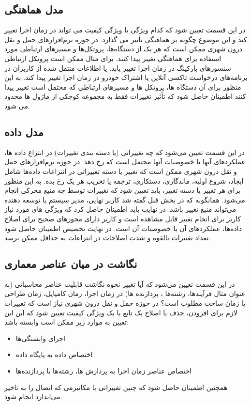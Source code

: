 \subsection{مدل هماهنگی}
در این قسمت تعیین شود که کدام ویژگی یا ویژگی کیفیت می تواند در زمان اجرا تغییر کند و این موضوع چگونه بر هماهنگی تأثیر می گذارد. 
در حوزه نرم‌افزارهای حمل و نقل درون شهری ممکن است که هر یک از دستگاه‌ها، پروتکل‌ها و مسیرهای ارتباطی مورد استفاده برای هماهنگی تغییر پیدا کنند. برای مثال ممکن است پروتکل ارتباطی سنسورهای پارکینگ در زمان اجرا تغییر یابد. یا اطلاعات منتقل شده از کاربران در برنامه‌‌های درخواست تاکسی آنلاین یا اشتراک خودرو در زمان اجرا تغییر پیدا کند. به این منظور برای آن دستگاه ها، پروتکل ها و مسیرهای ارتباطی که محتمل است تغییر پیدا کنند اطمینان حاصل شود که تأثیر تغییرات فقط به مجموعه کوچکی از ماژول ها محدود می شود.
\subsection{مدل داده}
در این قسمت تعیین می‌شود که چه تغییراتی (یا دسته بندی تغییرات) در انتزاع داده ها، عملکردهای آنها یا خصوصیات آنها محتمل است که رخ دهد. در حوزه نرم‌افزارهای حمل و نقل درون شهری ممکن است که تغییر یا دسته تغییراتی در انتزاعات داده‌ها شامل ایجاد، شروع اولیه، ماندگاری، دستکاری، ترجمه یا تخریب هر یک رخ بده. به این منظور برای هر تغییر یا دسته تغییر، باید تعیین شود که تغییرات توسط چه منبع محرکی انجام می‌شود. همانگونه که در بخش قبل گفته شد کاربر نهایی، مدیر سیستم یا توسعه دهنده می‌تواند منبع تغییر باشد. در نهایت باید اطمینان حاصل کرد که ویژگی های مورد نیاز کاربر برای انجام تغییر قابل مشاهده است و  کاربر دارای مجوزهای صحیح برای اصلاح داده‌ها، عملکردهای آن یا خصوصیات آن است. در نهایت تخصیص اطمینان حاصل شود تعداد تغییرات بالقوه و شدت اصلاحات در انتزاعات به حداقل ممکن برسد.

\subsection{نگاشت در میان عناصر معماری}
در این قسمت تعیین می‌شود که آیا تغییر نحوه نگاشت قابلیت عناصر محاسباتی (به عنوان مثال فرآیندها، رشته‌ها ، پردازنده ها) در زمان اجرا، زمان کامپایل، زمان طراحی یا زمان ساخت مطلوب است؟
در حوزه حمل و نقل درون شهری نیاز است که تغییرات لازم برای افزودن، حذف یا اصلاح یک تابع یا یک ویژگی کیفیت تعیین شود که این این تعیین به موارد زیر ممکن است وابسته باشد:
\begin{itemize}
\item
اجرای وابستگی‌ها
\item
اختصاص داده به پایگاه داده
\item
اختصاص عناصر زمان اجرا به پردازش ها‌، رشته‌ها یا پردازنده‌ها
\end{itemize}
همچنین اطمینان حاصل شود که چنین تغییراتی با مکانیزمی که اتصال را به تاخیر می‌اندازد انجام شود.

